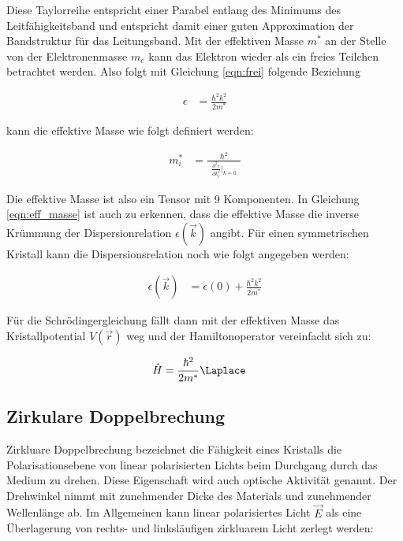 Diese Taylorreihe entspricht einer Parabel entlang des Minimums des Leitfähigkeitsband und entspricht damit einer guten Approximation der Bandstruktur für das Leitungsband. Mit der effektiven Masse $m^*$ an der Stelle von der Elektronenmasse $m_e$ kann das Elektron wieder als ein freies Teilchen betrachtet werden. Also folgt mit Gleichung \eqref{eqn:frei} folgende Beziehung

\begin{align}
    \epsilon &= \frac{\hbar^2 k^2}{2 m^*}
    \label{eqn:eff_frei}
\end{align}

kann die effektive Masse wie folgt definiert werden:

\begin{align}
    m^*_i &= \frac{\hbar^2}{\, \, \, \frac{\partial^2 \epsilon}{\partial k^2_i} \big \vert_{k=0} \, \, \,}
    \label{eqn:eff_masse}
\end{align}

Die effektive Masse ist also ein Tensor mit 9 Komponenten. In Gleichung \eqref{eqn:eff_masse} ist auch zu erkennen, dass die effektive Masse die inverse Krümmung der Dispersionrelation $\epsilon (\vec{k})$ angibt. Für einen symmetrischen Kristall kann die Dispersionsrelation noch wie folgt angegeben werden:

\begin{align}
    \epsilon (\vec{k}) &= \epsilon (0) + \frac{\hbar^2 k^2}{2 m^*}
    \label{eqn:eff_disp}
\end{align}

Für die Schrödingergleichung fällt dann mit der effektiven Masse das Kristallpotential $V(\vec{r})$ weg und der Hamiltonoperator vereinfacht sich zu:

\begin{align}
    \hat{H} &= \frac{\hbar^2}{2 m^*} \Laplace
    \label{eqn:Hamilton}
\end{align}

\subsection{Zirkulare Doppelbrechung}
\label{sec:Doppel}

Zirkluare Doppelbrechung bezeichnet die Fähigkeit eines Kristalls die Polarisationsebene von linear polarisierten Lichts beim Durchgang durch das Medium zu drehen. Diese Eigenschaft wird auch optische Aktivität genannt. Der Drehwinkel nimmt mit zunehmender Dicke des Materials und zunehmender Wellenlänge ab. Im Allgemeinen kann linear polarisiertes Licht $\vec{E}$ als eine Überlagerung von rechts- und linksläufigen zirkluarem Licht zerlegt werden:

